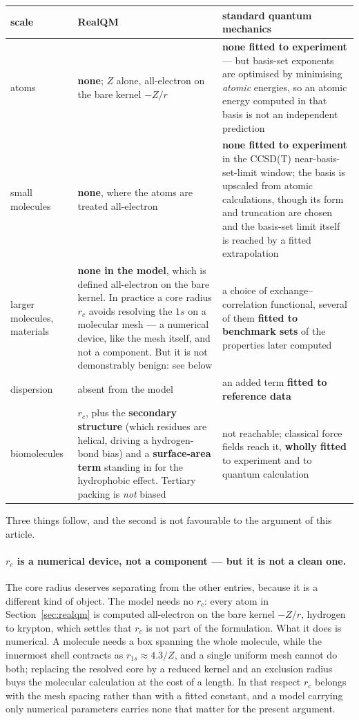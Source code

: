 \documentclass[11pt]{article}
\begin{document}
\begin{center}
\begin{tabular}{p{}p{}p{}}
\toprule
scale & RealQM & standard quantum mechanics \\
\midrule
atoms
 & \textbf{none}; $Z$ alone, all-electron on the bare kernel $-Z/r$
 & \textbf{none fitted to experiment} --- but basis-set exponents are optimised by minimising
   \emph{atomic} energies, so an atomic energy computed in that basis is not an independent
   prediction \\
\addlinespace
small molecules
 & \textbf{none}, where the atoms are treated all-electron
 & \textbf{none fitted to experiment} in the CCSD(T) near-basis-set-limit window; the basis is
   upscaled from atomic calculations, though its form and truncation are chosen and the
   basis-set limit itself is reached by a fitted extrapolation \\
\addlinespace
larger molecules, materials
 & \textbf{none in the model}, which is defined all-electron on the bare kernel. In practice a
   core radius $r_c$ avoids resolving the $1s$ on a molecular mesh --- a numerical device, like the
   mesh itself, and not a component. But it is not demonstrably benign: see below
 & a choice of exchange--correlation functional, several of them \textbf{fitted to benchmark
   sets} of the properties later computed \\
\addlinespace
dispersion
 & absent from the model
 & an added term \textbf{fitted to reference data} \\
\addlinespace
biomolecules
 & $r_c$, plus the \textbf{secondary structure} (which residues are helical, driving a
   hydrogen-bond bias) and a \textbf{surface-area term} standing in for the hydrophobic effect.
   Tertiary packing is \emph{not} biased
 & not reachable; classical force fields reach it, \textbf{wholly fitted} to experiment and to
   quantum calculation \\
\bottomrule
\end{tabular}
\end{center}

Three things follow, and the second is not favourable to the argument of this article.

\paragraph{$r_c$ is a numerical device, not a component --- but it is not a clean one.}
The core radius deserves separating from the other entries, because it is a different kind of
object. The model needs no $r_c$: every atom in Section~\ref{sec:realqm} is computed all-electron
on the bare kernel $-Z/r$, hydrogen to krypton, which settles that $r_c$ is not part of the
formulation. What it does is numerical. A molecule needs a box spanning the whole molecule, while
the innermost shell contracts as $r_{1s}\approx 4.3/Z$, and a single uniform mesh cannot do both;
replacing the resolved core by a reduced kernel and an exclusion radius buys the molecular
calculation at the cost of a length. In that respect $r_c$ belongs with the mesh spacing rather
than with a fitted constant, and a model carrying only numerical parameters carries none that
matter for the present argument.
\end{document}

